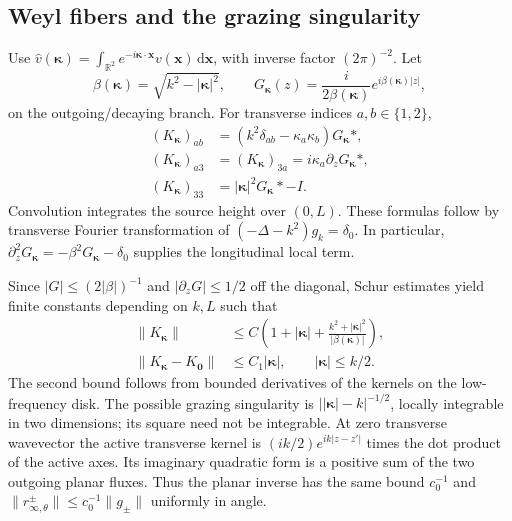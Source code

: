 \documentclass[11pt]{article}
\newcommand{\dd}{\,\mathrm{d}}
\newcommand{\norm}[1]{\lVert #1\rVert}
\newcommand{\abs}[1]{\lvert #1\rvert}
\begin{document}
\subsection{Weyl fibers and the grazing singularity}
Use $\widehat v(\boldsymbol\kappa)=\int_{\mathbb R^2}e^{-i\boldsymbol\kappa\cdot\mathbf x}v(\mathbf x)\dd\mathbf x$, with inverse factor $(2\pi)^{-2}$. Let
\begin{equation}\label{eq:weyl}
 \beta(\boldsymbol\kappa)=\sqrt{k^2-\abs{\boldsymbol\kappa}^2},\qquad
 G_{\boldsymbol\kappa}(z)=\frac{i}{2\beta(\boldsymbol\kappa)}e^{i\beta(\boldsymbol\kappa)\abs z},
\end{equation}
on the outgoing/decaying branch. For transverse indices $a,b\in\{1,2\}$,
\begin{equation}\label{eq:weyl-blocks}
 \begin{aligned}
 (K_{\boldsymbol\kappa})_{ab}&=(k^2\delta_{ab}-\kappa_a\kappa_b)G_{\boldsymbol\kappa}*,\\
 (K_{\boldsymbol\kappa})_{a3}&=(K_{\boldsymbol\kappa})_{3a}=i\kappa_a\partial_zG_{\boldsymbol\kappa}*,\\
 (K_{\boldsymbol\kappa})_{33}&=\abs{\boldsymbol\kappa}^2G_{\boldsymbol\kappa}*-I.
 \end{aligned}
\end{equation}
Convolution integrates the source height over $(0,L)$. These formulas follow by transverse Fourier transformation of $( -\Delta-k^2)g_k=\delta_0$. In particular, $\partial_z^2G_{\boldsymbol\kappa}=-\beta^2G_{\boldsymbol\kappa}-\delta_0$ supplies the longitudinal local term.

Since $\abs G\leq(2\abs\beta)^{-1}$ and $\abs{\partial_zG}\leq1/2$ off the diagonal, Schur estimates yield finite constants depending on $k,L$ such that
\begin{equation}\label{eq:fiber-bounds}
 \begin{aligned}
 \norm{K_{\boldsymbol\kappa}}&\leq C\left(1+\abs{\boldsymbol\kappa}
       +\frac{k^2+\abs{\boldsymbol\kappa}^2}{\abs{\beta(\boldsymbol\kappa)}}\right),\\
 \norm{K_{\boldsymbol\kappa}-K_{\mathbf0}}&\leq C_1\abs{\boldsymbol\kappa},
       \qquad\abs{\boldsymbol\kappa}\leq k/2.
 \end{aligned}
\end{equation}
The second bound follows from bounded derivatives of the kernels on the low-frequency disk. The possible grazing singularity is $\big\lvert\abs{\boldsymbol\kappa}-k\big\rvert^{-1/2}$, locally integrable in two dimensions; its square need not be integrable. At zero transverse wavevector the active transverse kernel is $(ik/2)e^{ik\abs{z-z'}}$ times the dot product of the active axes. Its imaginary quadratic form is a positive sum of the two outgoing planar fluxes. Thus the planar inverse has the same bound $c_0^{-1}$ and $\norm{r_{\infty,\theta}^\pm}\leq c_0^{-1}\norm{g_\pm}$ uniformly in angle.
\end{document}
